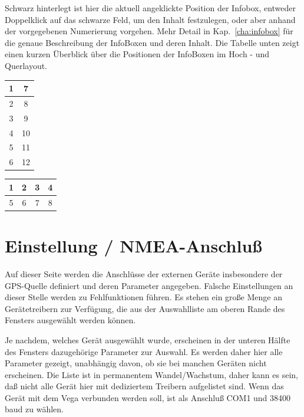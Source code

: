 Schwarz hinterlegt ist hier die aktuell angeklickte Position der Infobox, entweder Doppelklick auf das schwarze Feld, um
den Inhalt festzulegen, oder aber anhand der vorgegebenen Numerierung vorgehen. Mehr Detail in Kap.~\ref{cha:infobox} für die genaue Beschreibung der InfoBoxen und deren Inhalt.
Die Tabelle unten zeigt einen kurzen Überblick über die Positionen der InfoBoxen im Hoch - und Querlayout.
\begin{center}\begin{multicols}{2}
\begin{tabular}{|c|c|}
\hline
1 & 7 \\
\hline
2 & 8 \\
\hline
3 & 9 \\
\hline
4 & 10 \\
\hline
5 & 11 \\
\hline
6 & 12 \\
\hline
\end{tabular}

\begin{tabular}{|c|c|c|c|}
\hline
1 & 2 & 3 & 4 \\
\hline
\hline
5 & 6 & 7 & 8 \\
\hline
\end{tabular}
\end{multicols}
\end{center}
\section{Einstellung / NMEA-Anschluß} \label{conf:comdevices}

Auf dieser Seite werden die Anschlüsse der externen Geräte insbesondere der GPS-Quelle definiert und deren Parameter
angegeben. Falsche Einstellungen an dieser Stelle werden zu Fehlfunktionen führen. Es stehen ein große Menge an Gerätetreibern zur Verfügung, die aus der Auswahlliste am
oberen Rande des Fensters ausgewählt werden können.

Je nachdem, welches Gerät ausgewählt wurde, erscheinen in der unteren Hälfte des Fensters dazugehörige
Parameter zur Auswahl. \achtung Es werden daher hier alle Parameter gezeigt, unabhängig davon, ob sie bei manchen Geräten nicht erscheinen.
Die Liste ist in permanentem Wandel/Wachstum, daher kann es sein, daß nicht alle Gerät hier mit dediziertem Treibern aufgelistet sind.
Wenn das Gerät mit dem Vega verbunden werden soll, ist als Anschluß COM1 und 38400 baud zu wählen.

